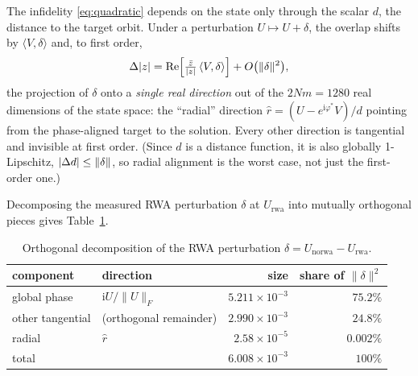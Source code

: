 \documentclass[11pt]{article}
\newcommand{\ii}{\mathrm{i}}
\renewcommand{\Re}{\operatorname{Re}}
\newcommand{\norm}[1]{\lVert #1 \rVert}
\DeclarePairedDelimiter{\abs}{\lvert}{\rvert}
\begin{document}
The infidelity \eqref{eq:quadratic} depends on the state only through the
scalar $d$, the distance to the target orbit.  Under a perturbation
$U \mapsto U + \delta$, the overlap shifts by
$\langle V, \delta\rangle$ and, to first order,
\begin{equation}
    \Delta\abs{z}
    = \Re\Bigl[\tfrac{\bar z}{\abs{z}}\,\langle V, \delta\rangle\Bigr]
    + O\bigl(\norm{\delta}^2\bigr),
\end{equation}
the projection of $\delta$ onto a \emph{single real direction} out of the
$2Nm = 1280$ real dimensions of the state space: the ``radial'' direction
$\hat r = (U - e^{\ii\varphi^*}V)/d$ pointing from the phase-aligned target to
the solution.  Every other direction is tangential and invisible at first
order.  (Since $d$ is a distance function, it is also globally 1-Lipschitz,
$\abs{\Delta d} \le \norm{\delta}$, so radial alignment is the worst case, not
just the first-order one.)

Decomposing the measured RWA perturbation $\delta$ at $U_{\mathrm{rwa}}$ into
mutually orthogonal pieces gives Table~\ref{tab:decomposition}.

\begin{table}[ht]
\centering
\begin{tabular}{llrr}
\toprule
component & direction & size & share of $\norm{\delta}^2$ \\
\midrule
global phase & $\ii U/\norm{U}_F$ & $5.211\times10^{-3}$ & $75.2\%$ \\
other tangential & (orthogonal remainder) & $2.990\times10^{-3}$ & $24.8\%$ \\
radial & $\hat r$ & $2.58\times10^{-5}$ & $0.002\%$ \\
\midrule
total & & $6.008\times10^{-3}$ & $100\%$ \\
\bottomrule
\end{tabular}
\caption{Orthogonal decomposition of the RWA perturbation
$\delta = U_{\mathrm{norwa}} - U_{\mathrm{rwa}}$.}
\label{tab:decomposition}
\end{table}
\end{document}
